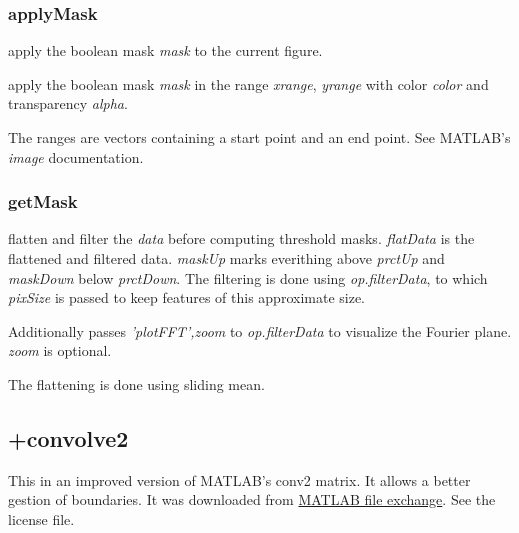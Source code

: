 \subsubsection{applyMask}
\bdf
{} apply the boolean mask \emph{mask} to the current figure.

 apply the boolean mask \emph{mask} in the range \emph{xrange}, \emph{yrange} with color \emph{color} and transparency \emph{alpha}. 
\edf

The ranges are vectors containing a start point and an end point. See MATLAB's \emph{image} documentation.
\subsubsection{getMask}
\bdf
{}
 flatten and filter the \emph{data} before computing threshold masks. \emph{flatData} is the flattened and filtered data. \emph{maskUp} marks everithing above \emph{prctUp} and \emph{maskDown} below \emph{prctDown}. The filtering is done using \emph{op.filterData}, to which \emph{pixSize} is passed to keep features of this approximate size.

Additionally passes \emph{'plotFFT',zoom} to \emph{op.filterData} to visualize the Fourier plane. \emph{zoom} is optional.
\edf

The flattening is done using sliding mean.

\subsection{+convolve2}
This in an improved version of MATLAB's conv2 matrix. It allows a better gestion of boundaries. 
It was downloaded from \href{http://www.mathworks.com/matlabcentral/fileexchange/22619-fast-2-d-convolution}{MATLAB file exchange}. See the license file.